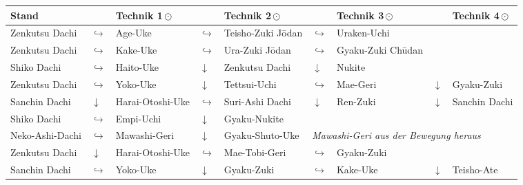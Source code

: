\clearpage
\pagebreak
\setcounter{num}{0}
\setcounter{numz}{0}
\setlength{\tabcolsep}{3pt}	
\begin{tcolorbox}[width=\textwidth,height=\textheight,right=12pt,left=12pt,colframe=GKD,colback=white,fonttitle=\bfseries,coltitle=white,title=Allgemeines:\indent Ergänzungen / Kombinationen / Koordination]
	\null\vfill\null
	\begin{tabularx}{\textwidth}{lllllllll}
		\textbf{Stand} 		& & \textbf{Technik 1\,\(\odot\)} 	&& \textbf{Technik 2\,\(\odot\)} 	&& \textbf{Technik 3\,\(\odot\)}&& \textbf{Technik 4\,\(\odot\)}\\
		\midrule
		Zenkutsu Dachi 		& \(\hookrightarrow\)	& Age-Uke					& \(\hookrightarrow\)	& Teisho-Zuki J\={o}dan	& \(\hookrightarrow\)	& Uraken-Uchi&&	\\
		\midrule
		Zenkutsu Dachi 		& \(\hookrightarrow\)	& Kake-Uke					& \(\hookrightarrow\)	& Ura-Zuki J\={o}dan	& \(\hookrightarrow\)	& Gyaku-Zuki Ch\={u}dan&&	\\
		\midrule
		Shiko Dachi			& \(\hookrightarrow\)	& Haito-Uke					& \(\downarrow\)		& Zenkutsu Dachi 		& \(\downarrow\)		& Nukite&&\\
		\midrule
		Zenkutsu Dachi		& \(\hookrightarrow\)	& Yoko-Uke					& \(\downarrow\)		& Tettsui-Uchi			& \(\hookrightarrow\)	& Mae-Geri &\(\downarrow\) & Gyaku-Zuki\\
		\midrule
		Sanchin Dachi		& \(\downarrow\)		& Harai-Otoshi-Uke			& \(\hookrightarrow\)	& Suri-Ashi Dachi		& \(\downarrow\)		& Ren-Zuki &\(\downarrow\) & Sanchin Dachi\\
		\midrule
		Shiko Dachi			& \(\hookrightarrow\)	& Empi-Uchi					& \(\downarrow\)		& Gyaku-Nukite			&&&&\\
		\midrule
		Neko-Ashi-Dachi		& \(\hookrightarrow\)	& Mawashi-Geri	& \(\downarrow\)		& Gyaku-Shuto-Uke		&\multicolumn{4}{l}{\textit{{\footnotesize Mawashi-Geri aus der Bewegung heraus}}}\\
		\midrule
		Zenkutsu Dachi		& \(\downarrow\)		& Harai-Otoshi-Uke			& \(\hookrightarrow\)	& Mae-Tobi-Geri			& \(\hookrightarrow\)	& Gyaku-Zuki &&\\
		\midrule
		Sanchin Dachi		& \(\hookrightarrow\)	& Yoko-Uke					& \(\downarrow\)		& Gyaku-Zuki			& \(\hookrightarrow\)	& Kake-Uke	& \(\downarrow\)& Teisho-Ate \\					
	\end{tabularx}\\\null\vfill\null
	\setlength{\tabcolsep}{6pt}	
\end{tcolorbox}

